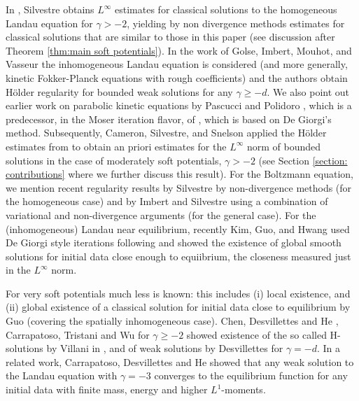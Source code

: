 \documentclass[12pt,american]{amsart}
\numberwithin{equation}{section}
\theoremstyle{plain}
\theoremstyle{definition}                  %
\begin{document}
In \cite{Silvestre2015}, Silvestre obtains $L^\infty$ estimates for classical solutions to the homogeneous Landau equation for $\gamma> -2$, yielding by non divergence methods estimates for classical solutions that are similar to those in this paper (see discussion after Theorem \ref{thm:main soft potentials}). In the work of Golse, Imbert, Mouhot, and Vasseur \cite{GIMV16}  the inhomogeneous Landau equation is considered (and more generally, kinetic Fokker-Planck equations with rough coefficients) and the authors obtain H\"older regularity for bounded weak solutions for any $\gamma\ge-d$. We also point out earlier work on parabolic kinetic equations by Pascucci and Polidoro \cite{PascucciPolidoro2004}, which is a predecessor, in the Moser iteration flavor, of \cite{GIMV16}, which is based on De Giorgi's method. Subsequently, Cameron, Silvestre, and Snelson \cite{CamSilSne2017} applied the H\"older estimates from \cite{GIMV16} to obtain an priori estimates for the $L^\infty$ norm of bounded solutions in the case of moderately soft potentials, $\gamma>-2$ (see Section \ref{section: contributions} where we further discuss this result). For the Boltzmann equation, we mention recent regularity results by Silvestre \cite{Silvestre2014} by non-divergence methods (for the homogeneous case) and by Imbert and Silvestre \cite{Imb_Silv2017} using a combination of variational and non-divergence arguments (for the general case). For the (inhomogeneous) Landau near equilibrium, recently Kim, Guo, and Hwang \cite{KimGuoHwang2016} used De Giorgi style iterations following \cite{GIMV16} and showed the existence of global smooth solutions for initial data close enough to equiibrium, the closeness measured just in the $L^\infty$ norm.

For very soft potentials much less is known: this includes (i) local existence, and (ii) global existence of a classical solution for initial data close to equilibrium by Guo \cite{Guo02} (covering the spatially inhomogeneous case). Chen, Desvillettes and He \cite{CDH09},  Carrapatoso, Tristani and Wu \cite{CTW15} for $\gamma \ge -2$ showed existence of the so called H-solutions by Villani in \cite{V98}, and of weak solutions by Desvillettes \cite{Desvillettes14} for $\gamma=-d$. In a related work, Carrapatoso, Desvillettes and He \cite{CDH15} showed that any weak solution to the Landau equation with $\gamma =-3$ converges to the equilibrium function for any initial data with finite mass, energy and higher $L^1$-moments.
\end{document}

